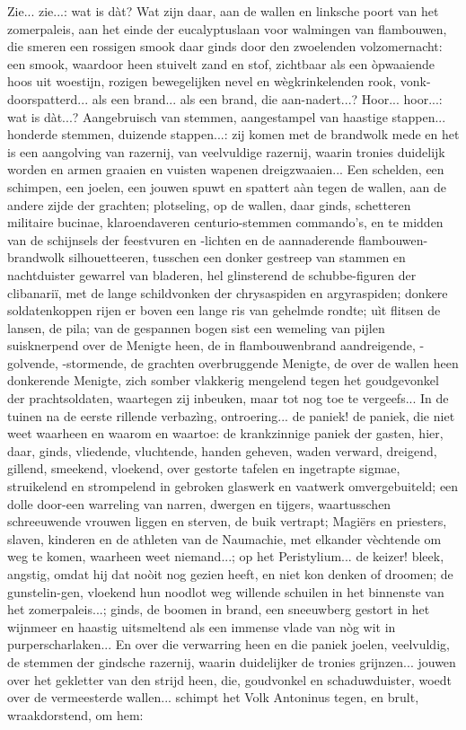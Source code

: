 \documentclass[a4paper, 12pt, oneside, dutch]{article}
\begin{document}
Zie... zie...: wat is dàt? Wat zijn daar, aan de wallen en linksche poort van het zomerpaleis, aan het einde der eucalyptuslaan voor walmingen van flambouwen, die smeren een rossigen smook daar ginds door den zwoelenden volzomernacht: een smook, waardoor heen stuivelt zand en stof, zichtbaar als een òpwaaiende hoos uit woestijn, rozigen bewegelijken nevel en wègkrinkelenden rook, vonk-doorspatterd... als een brand... als een brand, die aan-nadert...? Hoor... hoor...: wat is dàt...? Aangebruisch van stemmen, aangestampel van haastige stappen... honderde stemmen, duizende stappen...: zij komen met de brandwolk mede en het is een aangolving van razernij, van veelvuldige razernij, waarin tronies duidelijk worden en armen graaien en vuisten wapenen dreigzwaaien... Een schelden, een schimpen, een joelen, een jouwen spuwt en spattert aàn tegen de wallen, aan de andere zijde der grachten; plotseling, op de wallen, daar ginds, schetteren militaire bucinae, klaroendaveren centurio-stemmen commando's, en te midden van de schijnsels der feestvuren en -lichten en de aannaderende flambouwen-brandwolk silhouetteeren, tusschen een donker gestreep van stammen en nachtduister gewarrel van bladeren, hel glinsterend de schubbe-figuren der clibanariï, met de lange schildvonken der chrysaspiden en argyraspiden; donkere soldatenkoppen rijen er boven een lange ris van gehelmde rondte; uìt flitsen de lansen, de pila; van de gespannen bogen sist een wemeling van pijlen suisknerpend over de Menigte heen, de in flambouwenbrand aandreigende, -golvende, -stormende, de grachten overbruggende Menigte, de over de wallen heen donkerende Menigte, zich somber vlakkerig mengelend tegen het goudgevonkel der prachtsoldaten, waartegen zij inbeuken, maar tot nog toe te vergeefs... In de tuinen na de eerste rillende verbazìng, ontroering... de paniek! de paniek, die niet weet waarheen en waarom en waartoe: de krankzinnige paniek der gasten, hier, daar, ginds, vliedende, vluchtende, handen geheven, waden verward, dreigend, gillend, smeekend, vloekend, over gestorte tafelen en ingetrapte sigmae, struikelend en strompelend in gebroken glaswerk en vaatwerk omvergebuiteld; een dolle door-een warreling van narren, dwergen en tijgers, waartusschen schreeuwende vrouwen liggen en sterven, de buik vertrapt; Magiërs en priesters, slaven, kinderen en de athleten van de Naumachie, met elkander vèchtende om weg te komen, waarheen weet niemand...; op het Peristylium... de keizer! bleek, angstig, omdat hij dat noòit nog gezien heeft, en niet kon denken of droomen; de gunstelin-gen, vloekend hun noodlot weg willende schuilen in het binnenste van het zomerpaleis...; ginds, de boomen in brand, een sneeuwberg gestort in het wijnmeer en haastig uitsmeltend als een immense vlade van nòg wit in purperscharlaken... En over die verwarring heen en die paniek joelen, veelvuldig, de stemmen der gindsche razernij, waarin duidelijker de tronies grijnzen... jouwen over het gekletter van den strijd heen, die, goudvonkel en schaduwduister, woedt over de vermeesterde wallen... schimpt het Volk Antoninus tegen, en brult, wraakdorstend, om hem:
\end{document}
